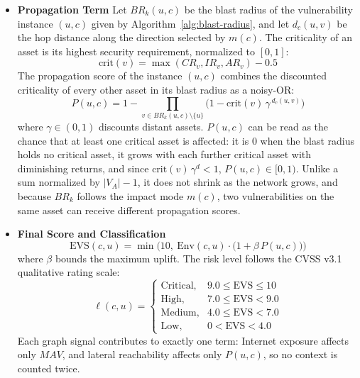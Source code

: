 \documentclass[conference]{IEEEtran}
\begin{document}
\begin{itemize}
    \item{\textbf{Propagation Term}}
    Let $BR_k(u,c)$ be the blast radius of the vulnerability instance
    $(u,c)$ given by Algorithm~\ref{alg:blast-radius}, and let $d_c(u,v)$ be
    the hop distance along the direction selected by $m(c)$. The criticality
    of an asset is its highest security requirement, normalized to $[0,1]$:
    \begin{equation}
    \mathrm{crit}(v) = \max(CR_v, IR_v, AR_v) - 0.5
    \end{equation}
    The propagation score of the instance $(u,c)$ combines the discounted
    criticality of every other asset in its blast radius as a noisy-OR:
    \begin{equation}
    P(u,c) = 1 - \prod_{v \in BR_k(u,c)\setminus\{u\}} \Big(1 - \mathrm{crit}(v)\,\gamma^{\,d_c(u,v)}\Big)
    \end{equation}
    where $\gamma \in (0,1)$ discounts distant assets. $P(u,c)$ can be read
    as the chance that at least one critical asset is affected: it is $0$
    when the blast radius holds no critical asset, it grows with each further
    critical asset with diminishing returns, and since
    $\mathrm{crit}(v)\,\gamma^{d} < 1$, $P(u,c) \in [0,1)$. Unlike a sum
    normalized by $|V_A|-1$, it does not shrink as the network grows, and
    because $BR_k$ follows the impact mode $m(c)$, two vulnerabilities on the
    same asset can receive different propagation scores.
    
    \item {\textbf{Final Score and Classification}}
    \begin{equation}
    \mathrm{EVS}(c,u) = \min\!\Big(10,\ \mathrm{Env}(c,u)\cdot\big(1+\beta\,P(u,c)\big)\Big)
    \end{equation}
    where $\beta$ bounds the maximum uplift. The risk level follows the
    CVSS v3.1 qualitative rating scale:
    \begin{equation}
    \ell(c,u) =
    \begin{cases}
    \text{Critical}, & 9.0 \le \mathrm{EVS} \le 10\\
    \text{High}, & 7.0 \le \mathrm{EVS} < 9.0\\
    \text{Medium}, & 4.0 \le \mathrm{EVS} < 7.0\\
    \text{Low}, & 0 < \mathrm{EVS} < 4.0
    \end{cases}
    \end{equation}
    Each graph signal contributes to exactly one term: Internet exposure
    affects only $MAV$, and lateral reachability affects only $P(u,c)$,
    so no context is counted twice.
    \end{itemize}
\end{document}
